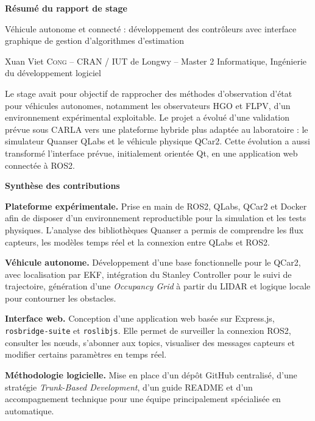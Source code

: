 \documentclass[10pt,a4paper]{article}
\newcommand{\resumeSection}[1]{%
  \vspace{0.12em}
  {\large\bfseries\color{cranblue}#1}\par
  \vspace{0.05em}
}
\begin{document}
\thispagestyle{empty}

\begin{center}
{\LARGE\bfseries Résumé du rapport de stage\par}
\vspace{0.15em}
{\large Véhicule autonome et connecté : développement des contrôleurs avec interface graphique de gestion d'algorithmes d'estimation\par}
\vspace{0.15em}
{\small Xuan Viet \textsc{Cong} -- CRAN / IUT de Longwy -- Master 2 Informatique, Ingénierie du développement logiciel}
\end{center}

\begin{tcolorbox}[colback=softblue,colframe=cranblue!45,boxrule=0.6pt,arc=1mm,left=2mm,right=2mm,top=1mm,bottom=1mm]
Le stage avait pour objectif de rapprocher des méthodes d'observation d'état pour véhicules autonomes, notamment les observateurs HGO et FLPV, d'un environnement expérimental exploitable. Le projet a évolué d'une validation prévue sous CARLA vers une plateforme hybride plus adaptée au laboratoire : le simulateur Quanser QLabs et le véhicule physique QCar2. Cette évolution a aussi transformé l'interface prévue, initialement orientée Qt, en une application web connectée à ROS2.
\end{tcolorbox}

\resumeSection{Synthèse des contributions}
\small
\begin{minipage}[t]{0.48\linewidth}
\textbf{Plateforme expérimentale.} Prise en main de ROS2, QLabs, QCar2 et Docker afin de disposer d'un environnement reproductible pour la simulation et les tests physiques. L'analyse des bibliothèques Quanser a permis de comprendre les flux capteurs, les modèles temps réel et la connexion entre QLabs et ROS2.

\textbf{Véhicule autonome.} Développement d'une base fonctionnelle pour le QCar2, avec localisation par EKF, intégration du Stanley Controller pour le suivi de trajectoire, génération d'une \textit{Occupancy Grid} à partir du LIDAR et logique locale pour contourner les obstacles.
\end{minipage}
\hfill
\begin{minipage}[t]{0.48\linewidth}

\textbf{Interface web.} Conception d'une application web basée sur Express.js, \texttt{rosbridge-suite} et \texttt{roslibjs}. Elle permet de surveiller la connexion ROS2, consulter les nœuds, s'abonner aux topics, visualiser des messages capteurs et modifier certains paramètres en temps réel.

\textbf{Méthodologie logicielle.} Mise en place d'un dépôt GitHub centralisé, d'une stratégie \textit{Trunk-Based Development}, d'un guide README et d'un accompagnement technique pour une équipe principalement spécialisée en automatique.
\end{minipage}
\normalsize
\end{document}
